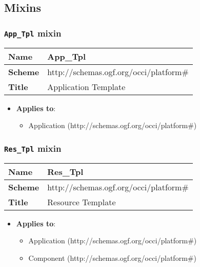 \subsection{Mixins}
\subsubsection{\texttt{App\_Tpl} mixin}
\begin{center}
\begin{tabular}{|l|l|}
  \hline
  \textbf{Name} & App\_Tpl \\
  \hline  
  \textbf{Scheme} & http://schemas.ogf.org/occi/platform\# \\
  \hline
  \textbf{Title} & Application Template \\
  \hline
\end{tabular}
\end{center}
\begin{itemize}
\item \textbf{Applies to}:
\begin{itemize}
	\item Application (http://schemas.ogf.org/occi/platform\#)
\end{itemize}
\end{itemize} 



 
\subsubsection{\texttt{Res\_Tpl} mixin}
\begin{center}
\begin{tabular}{|l|l|}
  \hline
  \textbf{Name} & Res\_Tpl \\
  \hline  
  \textbf{Scheme} & http://schemas.ogf.org/occi/platform\# \\
  \hline
  \textbf{Title} & Resource Template \\
  \hline
\end{tabular}
\end{center}
\begin{itemize}
\item \textbf{Applies to}:
\begin{itemize}
	\item Application (http://schemas.ogf.org/occi/platform\#)
	\item Component (http://schemas.ogf.org/occi/platform\#)
\end{itemize}
\end{itemize} 



